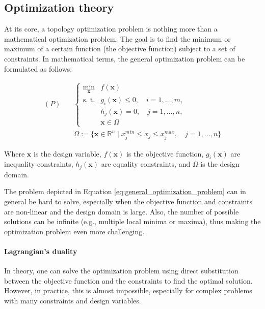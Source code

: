 \subsection{Optimization theory}
\label{subsec:optimization_theory}

At its core, a topology optimization problem is nothing more than a mathematical optimization problem.
The goal is to find the minimum or maximum of a certain function (the objective function) subject to a set of constraints.
In mathematical terms, the general optimization problem can be formulated as follows:

\begin{equation}
    \begin{aligned}
        (P) \quad & \begin{cases}
                        \min_{\bm{x}} & f(\bm{x})                                  \\
                        \text{s. t.}  & g_i(\bm{x}) \leq 0, \quad i = 1, \dots, m, \\
                                      & h_j(\bm{x}) = 0, \quad j = 1, \dots, n,    \\
                                      & \bm{x} \in \Omega
                    \end{cases}                             \\
                  & \Omega := \{ \bm{x} \in \mathbb{R}^n \mid x_j^{min} \leq x_j \leq x_j^{max}, \quad j = 1, \dots, n \}
    \end{aligned}
    \label{eq:general_optimization_problem}
\end{equation}

Where $\bm{x}$ is the design variable, $f(\bm{x})$ is the objective function, $g_i(\bm{x})$ are inequality constraints, $h_j(\bm{x})$ are equality constraints, and $\Omega$ is the design domain.

The problem depicted in Equation \ref{eq:general_optimization_problem} can in general be hard to solve, especially when the objective function and constraints are non-linear and the design domain is large.
Also, the number of possible solutions can be infinite (e.g., multiple local minima or maxima), thus making the optimization problem even more challenging.

\paragraph{Lagrangian's duality}

In theory, one can solve the optimization problem using direct substitution between the objective function and the constraints to find the optimal solution.
However, in practice, this is almost impossible, especially for complex problems with many constraints and design variables.

